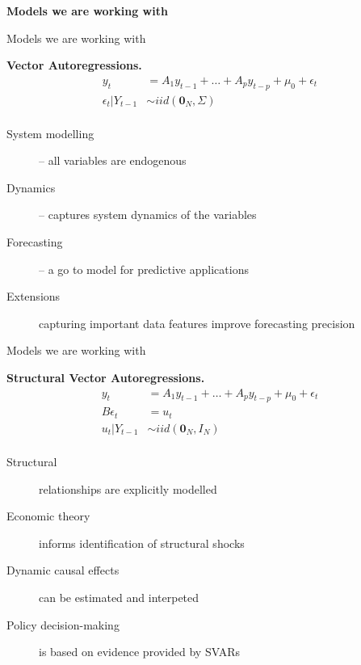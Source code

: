 \documentclass[notes,blackandwhite,mathsans]{beamer}
\begin{document}
{
\begin{frame}

\begin{adjustwidth}{-0.5cm}{0cm}
\vspace{8.3cm}\Large
\textbf{{\color{mcxs3}Models } {\color{mcxs1}we are working with}}
\end{adjustwidth}

\end{frame}
}




\begin{frame}{Models we are working with}

\textbf{Vector Autoregressions.}
\begin{align*}
y_t &= A_1 y_{t-1} + \dots + A_p y_{t-p}  + \mu_0 + \epsilon_t\\[1ex]
\epsilon_t|Y_{t-1} &\sim iid\left(\mathbf{0}_N,\Sigma\right)\\
\end{align*}

\begin{description}
\item[System modelling] {\color{mcxs2}-- all variables are endogenous} 
\item[Dynamics] {\color{mcxs2}-- captures system dynamics of the variables} 
\item[Forecasting] {\color{mcxs2}-- a go to model for predictive applications} 
\item[Extensions] {\color{mcxs2} capturing important data features improve forecasting precision}
\end{description}
\end{frame}




\begin{frame}{Models we are working with}

\textbf{Structural Vector Autoregressions.}
\begin{align*}
y_t &= A_1 y_{t-1} + \dots + A_p y_{t-p}  + \mu_0 + \epsilon_t\\[1ex]
B\epsilon_t &= u_t \\[1ex]
u_t|Y_{t-1} &\sim iid\left(\mathbf{0}_N,I_N\right)\\
\end{align*}

\begin{description}
\item[Structural] {\color{mcxs2}relationships are explicitly modelled} 
\item[Economic theory] {\color{mcxs2}informs identification of structural shocks} 
\item[Dynamic causal effects] {\color{mcxs2}can be estimated and interpeted} 
\item[Policy decision-making] {\color{mcxs2}is based on evidence provided by SVARs}
\end{description}
\end{frame}
\end{document}
